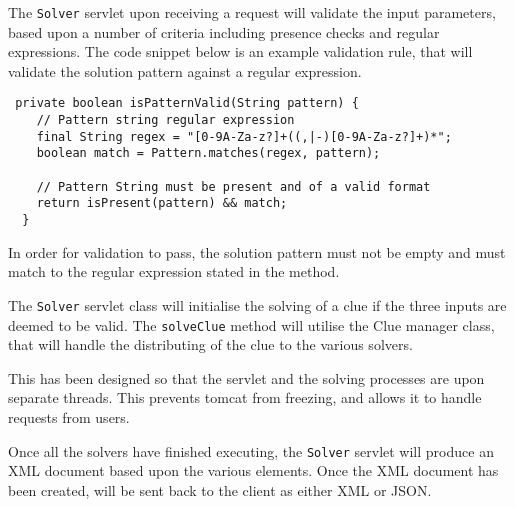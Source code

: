 The \texttt{Solver} servlet upon receiving a request will validate the input 
parameters, based upon a number of criteria including presence checks and 
regular expressions. The code snippet below is an example validation rule, that 
will validate the solution pattern against a regular expression.

\begin{verbatim}
 private boolean isPatternValid(String pattern) {
    // Pattern string regular expression
    final String regex = "[0-9A-Za-z?]+((,|-)[0-9A-Za-z?]+)*";
    boolean match = Pattern.matches(regex, pattern);

    // Pattern String must be present and of a valid format
    return isPresent(pattern) && match;
  }
\end{verbatim}

In order for validation to pass, the solution pattern must not be empty and must
match to the regular expression stated in the method.

The \texttt{Solver} servlet class will initialise the solving of a clue if the 
three inputs are deemed to be valid. The \texttt{solveClue} method will utilise 
the Clue manager class, that will handle the distributing of the clue to the 
various solvers. 

This has been designed so that the servlet and the solving processes are upon 
separate threads. This prevents tomcat from freezing, and allows it to handle 
requests from users.

Once all the solvers have finished executing, the \texttt{Solver} servlet will 
produce an XML document based upon the various elements. Once the XML document 
has been created, will be sent back to the client as either XML or JSON.
